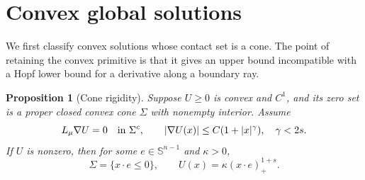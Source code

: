 \documentclass[11pt]{article}
\numberwithin{equation}{section}
\newtheorem{proposition}[theorem]{Proposition}
\theoremstyle{remark}
\newcommand{\Sph}{\mathbb S^{n-1}}
\newcommand{\abs}[1]{\lvert #1\rvert}
\begin{document}
\section{Convex global solutions}\label{sec:classification}

We first classify convex solutions whose contact set is a cone. The point of retaining the convex primitive is that it gives an upper bound incompatible with a Hopf lower bound for a derivative along a boundary ray.

\begin{proposition}[Cone rigidity]\label{prop:cone}
Suppose $U\ge0$ is convex and $C^1$, and its zero set is a proper closed convex cone $\Sigma$ with nonempty interior. Assume
\[
 L_\mu\nabla U=0\quad\hbox{in }\Sigma^c,
 \qquad \abs{\nabla U(x)}\le C(1+\abs{x}^{\gamma}),\quad\gamma<2s.
\]
If $U$ is nonzero, then for some $e\in\Sph$ and $\kappa>0$,
\begin{equation}\label{eq:profile}
 \Sigma=\{x\cdot e\le0\},\qquad U(x)=\kappa(x\cdot e)_+^{1+s}.
\end{equation}
\end{proposition}
\end{document}
